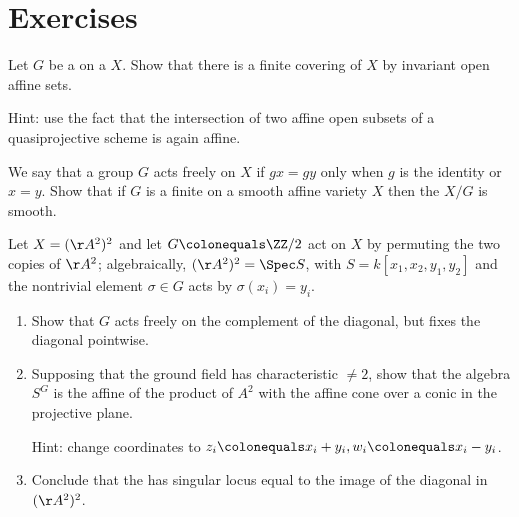 \section{Exercises}

\begin{exercise}\label{quotient of projective}
 Let $G$ be a 
%
on a 
%
$X$. 
Show that there is a finite covering of $X$ by invariant open affine sets.
 
 Hint: use the fact that the intersection of two affine open subsets of a quasiprojective scheme is again affine.
  \end{exercise}


\begin{exercise}\label{free actions}
We say that a group $G$ acts freely on $X$ if $gx = gy$ only when $g$ is the identity or $x=y$. Show that
 if $G$ is a finite 
%
on a smooth affine variety $X$ then the 
% 
$X/G$ is smooth.
\end{exercise}


\begin{exercise}
 \label{sym2A2} 
 Let $X = (\AA^{2})^{2}$ and let $G \colonequals \ZZ/2$ act on $X$ by permuting the two copies of  $\AA^{2}$; algebraically,
$(\AA^{2})^{2} = \Spec S$, with $S = k[x_{1},x_{2}, y_{1}, y_{2}]$ and the nontrivial element $\sigma\in G$ acts by
$\sigma(x_{i}) = y_{i}$. 
 \begin{enumerate}
\item Show that $G$ acts freely on the complement of the diagonal, but fixes the diagonal pointwise.
\item Supposing that the ground field has characteristic $\neq 2$,
show that the algebra $S^{G}$ is the affine 
%
of the product
of $A^2$ with the affine cone over a conic in the projective plane. 

Hint: change coordinates to $z_i \colonequals x_i+y_i, w_i \colonequals x_i - y_i$.
\item Conclude that the 
%
has singular locus equal to the image of the diagonal in 
$(\AA^{2})^{2}$.
\end{enumerate}
\end{exercise}

